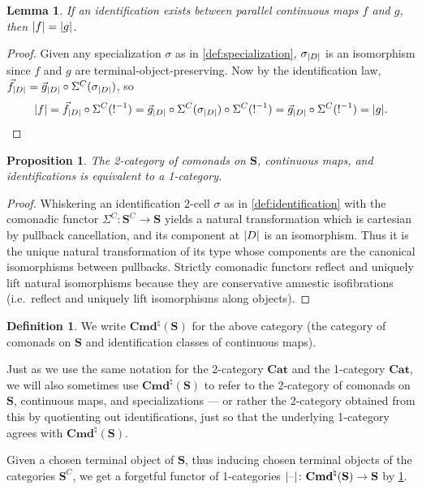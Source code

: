 \documentclass[11pt, oneside, article]{memoir}
\theoremstyle{plain}
\newtheorem{proposition}[theorem]{Proposition}
\newtheorem{lemma}[theorem]{Lemma}
\theoremstyle{definition}
\newtheorem{definition}[def]{Definition}
\theoremstyle{remark}
\newenvironment{remark}
{\renewcommand\qedsymbol{$\lrcorner$}%
  \pushQED{\qed}\myremark}
{\popQED\endmyremark}
\DeclarePairedDelimiter{\abs}{\lvert}{\rvert}
\newcommand{\dash}{{\mathord{\text{--}}}}
\newcommand{\bang}{\mathrm{!}}
\newcommand{\namedcat}[1]{\mathbf{#1}}
\newcommand{\cat}[1]{\mathbf{#1}}
\newcommand{\Cat}{\namedcat{Cat}}
\newcommand{\Con}{\namedcat{Cmd}^\natural}
\newcommand{\ConO}{\Con}
\newcommand{\CoalgOn}[2]{{#2}^{#1}}
\newcommand{\CoalgS}[1]{\CoalgOn{#1}{\bS}}
\newcommand{\pts}[1]{{\abs{#1}}}
\newcommand{\qpts}[1]{\pts{#1}}
\newcommand{\one}[1]{\pts{#1}}
\newcommand{\carr}{\Sigma}
\newcommand{\car}[1]{\carr^{#1}}
\newcommand{\carC}{\car{\cC}}
\newcommand{\connat}[1]{\vec{#1}}
\newcommand{\cmnd}[1]{{#1}}
\newcommand{\cC}{\cmnd{C}}
\newcommand{\cD}{\cmnd{D}}
\newcommand{\bS}{\cat{S}}
\newcommand{\CS}{\CoalgS{\cC}}
\newcommand{\final}{terminal-object-preserving}
\newcommand{\cartesian}{cartesian}
\begin{document}
\begin{lemma}\label{lem:one}
  If an identification exists between parallel continuous maps $f$ and
  $g$, then $\one{f} = \one{g}$.
\end{lemma}
\begin{proof}
  Given any specialization $\sigma$ as in \cref{def:specialization},
  $\sigma_{\qpts{\cD}}$ is an isomorphism since $f$ and $g$ are
  {\final}. Now by the identification law,
  $\connat{f}_{\qpts{\cD}} = \connat{g}_{\qpts{\cD}} \circ
  \carC(\sigma_{\qpts{\cD}})$, so
  \[\one{f} = \connat{f}_{\qpts{\cD}} \circ \carC(\bang^{-1}) =
    \connat{g}_{\qpts{\cD}} \circ \carC(\sigma_{\qpts{\cD}}) \circ
    \carC(\bang^{-1}) = \connat{g}_{\qpts{\cD}} \circ \carC(\bang^{-1})
    = \one{g}.\qedhere\]
\end{proof}

\begin{proposition}\label{lem:conid}
  The 2-category of comonads on $\bS$, continuous maps, and
  identifications is equivalent to a 1-category.
\end{proposition}
\begin{proof}
  Whiskering an identification 2-cell $\sigma$ as in
  \cref{def:identification} with the comonadic functor
  $\carC \colon \CS \to \bS$ yields a natural transformation which is
  {\cartesian} by pullback cancellation, and its component at
  $\qpts{\cD}$ is an isomorphism. Thus it is the unique natural
  transformation of its type whose components are the canonical
  isomorphisms between pullbacks.  Strictly comonadic functors reflect and
  uniquely lift natural isomorphisms because they are conservative
  amnestic isofibrations (i.e.\ reflect and uniquely lift isomorphisms
  along objects).
\end{proof}

\begin{definition}
  We write $\Con(\bS)$ for the above category (the category of
  comonads on $\bS$ and identification classes of continuous maps).
  
  Just as we use the same notation for the 2-category $\Cat$ and the
  1-category $\Cat$, we will also sometimes use $\Con(\bS)$ to refer
  to the 2-category of comonads on $\bS$, continuous maps, and
  specializations --- or rather the 2-category obtained from this by
  quotienting out identifications, just so that the underlying
  1-category agrees with $\Con(\bS)$.
\end{definition}

\begin{remark}
  Given a chosen terminal object of $\bS$, thus inducing chosen
  terminal objects of the categories $\CS$, we get a forgetful functor
  of 1-categories $\one{\dash} \colon \ConO(\bS) \to \bS$ by
  \cref{lem:one}.
\end{remark}
\end{document}
